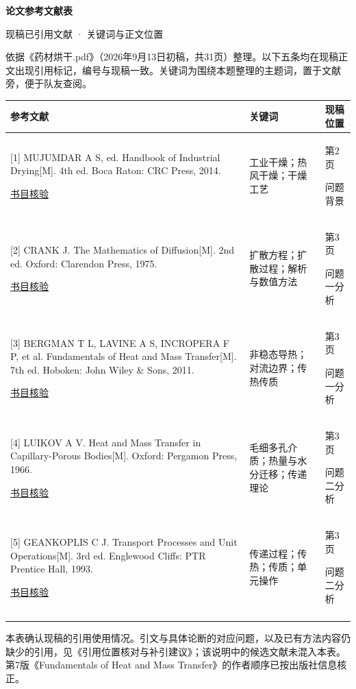 \documentclass[UTF8,a4paper,11pt,fontset=windows]{ctexart}
\begin{document}
\begin{center}{\Large\bfseries 论文参考文献表}\par{\normalsize 现稿已引用文献 · 关键词与正文位置}\end{center}

依据《药材烘干.pdf》（2026年9月13日初稿，共31页）整理。以下五条均在现稿正文出现引用标记，编号与现稿一致。关键词为围绕本题整理的主题词，置于文献旁，便于队友查阅。\par
\small
\begin{tabularx}{\textwidth}{@{}>{\raggedright\arraybackslash}X >{\raggedright\arraybackslash}p{30mm} >{\raggedright\arraybackslash}p{21mm}@{}}
\toprule 参考文献 & 关键词 & 现稿位置 \\ \midrule
{}[1] MUJUMDAR A S, ed. Handbook of Industrial Drying[M]. 4th ed. Boca Raton: CRC Press, 2014.\par\href{https://arunmujumdar.com/wp-content/uploads/2020/03/K20788\_output\_V2.pdf}{\footnotesize 书目核验} & 工业干燥；热风干燥；干燥工艺 & 第2页\par 问题背景\\ \addlinespace[0.65em]
{}[2] CRANK J. The Mathematics of Diffusion[M]. 2nd ed. Oxford: Clarendon Press, 1975.\par\href{https://biblio.neel.cnrs.fr/index.php?id=8642\&lang\_sel=fr\_FR\&lvl=notice\_display}{\footnotesize 书目核验} & 扩散方程；扩散过程；解析与数值方法 & 第3页\par 问题一分析\\ \addlinespace[0.65em]
{}[3] BERGMAN T L, LAVINE A S, INCROPERA F P, et al. Fundamentals of Heat and Mass Transfer[M]. 7th ed. Hoboken: John Wiley \& Sons, 2011.\par\href{https://bcs.wiley.com/he-bcs/Books?action=index\&bcsId=6563\&itemId=0470501979}{\footnotesize 书目核验} & 非稳态导热；对流边界；传热传质 & 第3页\par 问题一分析\\ \addlinespace[0.65em]
{}[4] LUIKOV A V. Heat and Mass Transfer in Capillary-Porous Bodies[M]. Oxford: Pergamon Press, 1966.\par\href{https://shop.elsevier.com/books/heat-and-mass-transfer-in-capillary-porous-bodies/luikov/978-1-4832-0065-1}{\footnotesize 书目核验} & 毛细多孔介质；热量与水分迁移；传递理论 & 第3页\par 问题二分析\\ \addlinespace[0.65em]
{}[5] GEANKOPLIS C J. Transport Processes and Unit Operations[M]. 3rd ed. Englewood Cliffs: PTR Prentice Hall, 1993.\par\href{https://library.kaist.ac.kr/search/ctlgSearch/posesn/view.do?bibctrlno=129772\&ty=B}{\footnotesize 书目核验} & 传递过程；传热；传质；单元操作 & 第3页\par 问题二分析\\ \addlinespace[0.65em]
\bottomrule\end{tabularx}\par
\vspace{0.8em}
{\footnotesize 本表确认现稿的引用使用情况。引文与具体论断的对应问题，以及已有方法内容仍缺少的引用，见《引用位置核对与补引建议》；该说明中的候选文献未混入本表。第7版《Fundamentals of Heat and Mass Transfer》的作者顺序已按出版社信息核正。}
\end{document}
